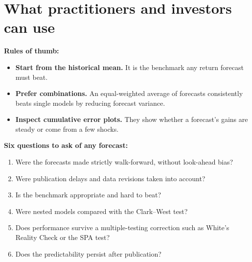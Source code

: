\section{What practitioners and investors can use}
\label{sec:09-investors}

\textbf{Rules of thumb:}
\begin{itemize}
  \item \textbf{Start from the historical mean.} It is the benchmark any return forecast must beat.
  \item \textbf{Prefer combinations.} An equal-weighted average of forecasts consistently beats single models by reducing forecast variance.
  \item \textbf{Inspect cumulative error plots.} They show whether a forecast's gains are steady or come from a few shocks.
\end{itemize}

\textbf{Six questions to ask of any forecast:}
\begin{enumerate}
  \item Were the forecasts made strictly walk-forward, without look-ahead bias?
  \item Were publication delays and data revisions taken into account?
  \item Is the benchmark appropriate and hard to beat?
  \item Were nested models compared with the Clark--West test?
  \item Does performance survive a multiple-testing correction such as White's Reality Check or the SPA test?
  \item Does the predictability persist after publication?
\end{enumerate}
